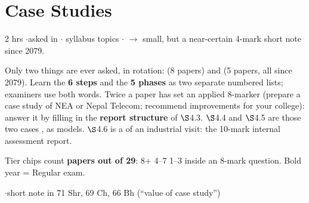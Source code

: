 \section{Case Studies}
{\color{sub}\footnotesize 2 hrs \gap$\cdot$\gap asked in 
\gap$\cdot$ syllabus topics \gap$\cdot$\gap {}
$\rightarrow$ small, but a near-certain 4-mark short note since 2079.}

\vspace{3pt}\noindent
\colorbox{gdL}{\makebox[\dimexpr\textwidth-2\fboxsep][l]{%
  \textcolor{gd}{\bfseries\footnotesize READ THIS FIRST}}}
\par\nobreak\vspace{3pt}

Only two things are ever asked, in rotation:  (8 papers) and
 (5 papers, all since 2079). Learn the \textbf{6 steps}
and the \textbf{5 phases} as two separate numbered lists; examiners use both words. Twice a
paper has set an applied 8-marker (prepare a case study of NEA or Nepal Telecom; recommend
improvements for your college): answer it by filling in the \textbf{report structure} of
$\S$4.3. $\S$4.4 and $\S$4.5 are those two cases , as models.
$\S$4.6 is a  of an industrial visit: the 10-mark internal
assessment report.

Tier chips count \textbf{papers out of 29}:  8+ \gap {} 4--7 \gap {} 1--3
inside an 8-mark question. Bold year = Regular exam.

\hr


{\color{sub}\footnotesize {}  \gap$\cdot$\gap short note in 71 Shr, 69 Ch, 66 Bh (``value of case study'')}

